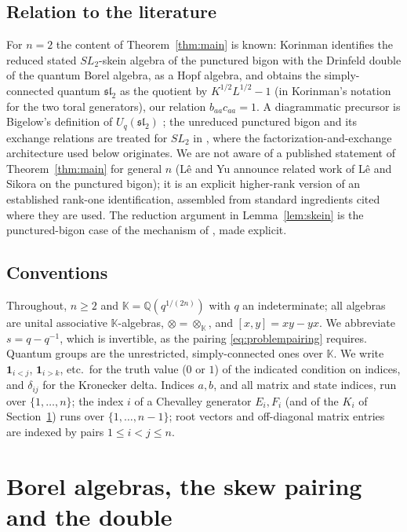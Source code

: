 \documentclass[12pt]{article}
\theoremstyle{remark}
\newcommand{\kk}{\mathbb K}
\newcommand{\U}{U_q}
\newcommand{\ot}{\otimes}
\begin{document}
\subsection{Relation to the literature}

For $n=2$ the content of Theorem~\ref{thm:main} is known: Korinman
\cite[Theorems 1.2 and 2.20]{Ko} identifies the reduced stated
$SL_2$-skein algebra of the punctured bigon with the Drinfeld double of
the quantum Borel algebra, as a Hopf algebra, and obtains the
simply-connected quantum $\mathfrak{sl}_2$ as the quotient by
$K^{1/2}L^{1/2}-1$ (in Korinman's notation for the two toral
generators), our relation $b_{aa}c_{aa}=1$. A diagrammatic
precursor is Bigelow's definition of $\U(\mathfrak{sl}_2)$ \cite{Big};
the unreduced punctured bigon and its exchange relations are treated
for $SL_2$ in \cite[Section 4.8]{CL}, where the
factorization-and-exchange architecture used below originates. We are
not aware of a published statement of Theorem~\ref{thm:main} for
general $n$ (L\^e and Yu \cite[Section 1.9]{LY} announce related work of
L\^e and Sikora on the punctured bigon); it is an explicit higher-rank
version of an established rank-one identification, assembled from
standard ingredients cited where they are used. The reduction argument
in Lemma~\ref{lem:skein} is the punctured-bigon case of the mechanism
of \cite[Theorem 7.2]{LY}, made explicit.

\subsection{Conventions}\label{sec:conventions}

Throughout, $n\ge2$ and $\kk=\mathbb Q(q^{1/(2n)})$ with $q$ an
indeterminate; all algebras are unital associative $\kk$-algebras,
$\ot=\ot_\kk$, and $[x,y]=xy-yx$. We abbreviate $s=q-q^{-1}$, which is
invertible, as the pairing \eqref{eq:problempairing} requires.
Quantum groups are the unrestricted, simply-connected ones over $\kk$.
We write $\mathbf 1_{i<j}$, $\mathbf 1_{i>k}$, etc.\ for the truth
value ($0$ or $1$) of the indicated condition on indices, and
$\delta_{ij}$ for the Kronecker delta. Indices $a,b$, and all matrix and
state indices, run over $\{1,\dots,n\}$; the index $i$ of a Chevalley
generator $E_i,F_i$ (and of the $K_i$ of Section~\ref{sec:double}) runs
over $\{1,\dots,n-1\}$; root vectors and
off-diagonal matrix entries are indexed by pairs $1\le i<j\le n$.

\section{Borel algebras, the skew pairing and the double}\label{sec:double}
\end{document}
